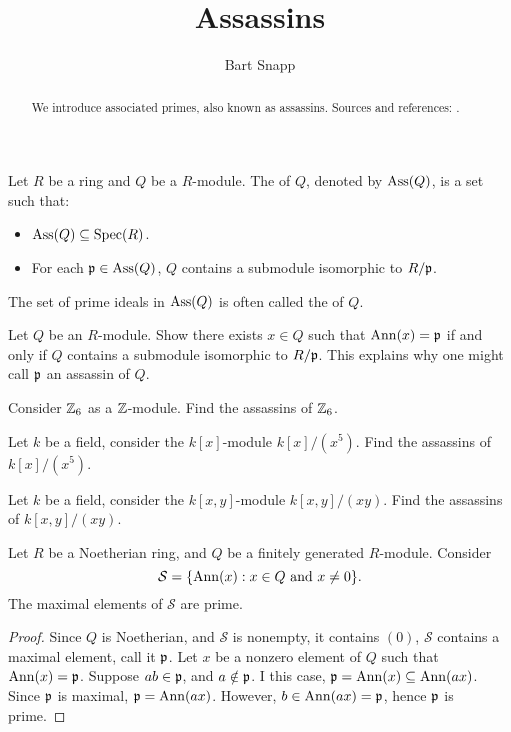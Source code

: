 \documentclass{ximera}
\author{Bart Snapp}
\title{Assassins}
\begin{document}
\begin{abstract}
  We introduce associated primes, also known as assassins. Sources and
  references: \cite{sD2008, dE1995, mR1995,jpS2000}.
\end{abstract}
\maketitle

\begin{definition}
  Let $R$ be a ring and $Q$ be a $R$-module. The  of
  $Q$, denoted by $\operatorname{Ass}(Q)$, is a set such that:
  \begin{itemize}
  \item $\operatorname{Ass}(Q)\subseteq\operatorname{Spec}(R)$.
  \item For each $\mathfrak{p}\in\operatorname{Ass}(Q)$, $Q$ contains a submodule isomorphic
    to $R/\mathfrak{p}$.
  \end{itemize}
  The set of prime ideals in $\operatorname{Ass}(Q)$ is often called the
   of $Q$.
\end{definition}

\begin{exercise}
  Let $Q$ be an $R$-module. Show there exists $x\in Q$ such that
  $\operatorname{Ann}(x) = \mathfrak{p}$ if and only if $Q$ contains a submodule isomorphic to
  $R/\mathfrak{p}$. This explains why one might call $\mathfrak{p}$ an assassin of $Q$.
\end{exercise}

\begin{exercise}
  Consider $\mathbb Z_6$ as a $\mathbb Z$-module. Find the assassins of $\mathbb Z_6$.
\end{exercise}

\begin{exercise}
  Let $k$ be a field, consider the $k[x]$-module $k[x]/(x^5)$. Find
  the assassins of $k[x]/(x^5)$.
\end{exercise}

\begin{exercise}
  Let $k$ be a field, consider the $k[x,y]$-module $k[x,y]/(xy)$. Find
  the assassins of $k[x,y]/(xy)$.
\end{exercise}



\begin{proposition}
  Let $R$ be a Noetherian ring, and $Q$ be a finitely generated
  $R$-module. Consider
  \[
  \mathcal{S} = \{\operatorname{Ann}(x): x\in Q\text{ and } x\ne0\}.
  \]
  The maximal elements of $\mathcal{S}$ are prime.
  \begin{proof}
    Since $Q$ is Noetherian, and $\mathcal{S}$ is nonempty, it
    contains $(0)$, $\mathcal{S}$ contains a maximal element, call it
    $\mathfrak{p}$.  Let $x$ be a nonzero element of $Q$ such that $\operatorname{Ann}(x) =
    \mathfrak{p}$.  Suppose $ab\in\mathfrak{p}$, and $a\notin\mathfrak{p}$.  I this case,
    $\mathfrak{p}=\operatorname{Ann}(x) \subseteq \operatorname{Ann}(ax)$. Since $\mathfrak{p}$ is maximal, $\mathfrak{p} =
    \operatorname{Ann}(ax)$. However, $b\in\operatorname{Ann}(ax) = \mathfrak{p}$, hence $\mathfrak{p}$ is prime.
  \end{proof}
\end{proposition}
\end{document}
